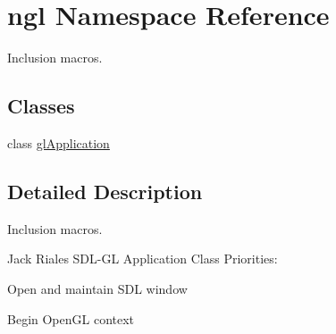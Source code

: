 \hypertarget{namespacengl}{}\section{ngl Namespace Reference}
\label{namespacengl}


Inclusion macros.  


\subsection*{Classes}
\begin{DoxyCompactItemize}
\item 
class \hyperlink{classngl_1_1gl_application}{gl\+Application}
\end{DoxyCompactItemize}


\subsection{Detailed Description}
Inclusion macros. 

Jack Riales S\+D\+L-\/\+G\+L Application Class Priorities\+:
\begin{DoxyItemize}
\item Open and maintain S\+D\+L window
\item Begin Open\+G\+L context 
\end{DoxyItemize}